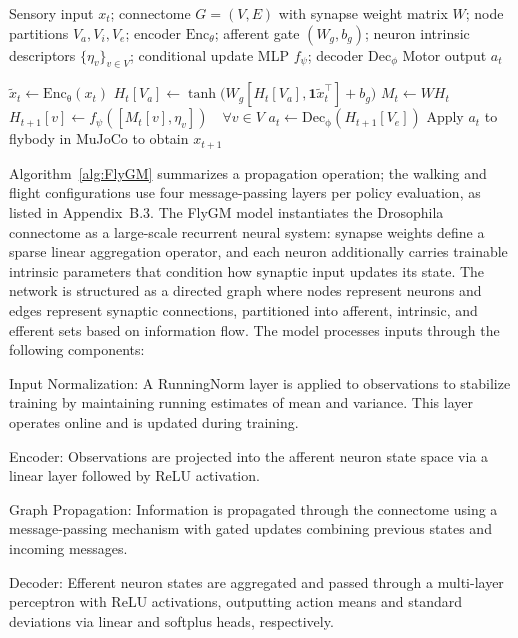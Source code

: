 \documentclass[a4paper]{easychair}
\begin{document}
\begin{algorithm}[H]
  \caption{Fly-connectomic Graph Model (FlyGM)}
  \label{alg:FlyGM}
  \begin{algorithmic}[1]
     Sensory input $x_t$; connectome $G=(V,E)$ with synapse weight matrix $W$; node partitions $V_a, V_i, V_e$;
    encoder $\mathrm{Enc}_\theta$; afferent gate $(W_g,b_g)$; neuron intrinsic descriptors $\{\eta_v\}_{v\in V}$;
    conditional update MLP $f_\psi$; decoder $\mathrm{Dec}_\phi$
     Motor output $a_t$

      \STATE $\tilde{x}_t \gets \mathrm{Enc_\theta}(x_t)$
      \STATE $H_t[V_a] \gets \tanh\!\big(W_g [H_t[V_a], \mathbf{1}\tilde{x}_t^\top] + b_g\big)$
      \STATE $M_t \gets W H_t$
      \STATE $H_{t+1}[v] \gets f_\psi([M_t[v], \eta_v]) \quad \forall v\in V$
      \STATE $a_t \gets \mathrm{Dec_\phi}(H_{t+1}[V_e])$
      \STATE Apply $a_t$ to flybody in MuJoCo to obtain $x_{t+1}$
    \ENDFOR
  \end{algorithmic}
\end{algorithm}

Algorithm~\ref{alg:FlyGM} summarizes a propagation operation; the walking and flight configurations use four message-passing layers per policy evaluation, as listed in Appendix~B.3. The FlyGM model instantiates the Drosophila connectome as a large-scale recurrent neural system: synapse weights define a sparse linear aggregation operator, and each neuron additionally carries trainable intrinsic parameters that condition how synaptic input updates its state. The network is structured as a directed graph where nodes represent neurons and edges represent synaptic connections, partitioned into afferent, intrinsic, and efferent sets based on information flow. The model processes inputs through the following components:

Input Normalization: A RunningNorm layer is applied to observations to stabilize training by maintaining running estimates of mean and variance. This layer operates online and is updated during training.

Encoder: Observations are projected into the afferent neuron state space via a linear layer followed by ReLU activation.

Graph Propagation: Information is propagated through the connectome using a message-passing mechanism with gated updates combining previous states and incoming messages.

Decoder: Efferent neuron states are aggregated and passed through a multi-layer perceptron with ReLU activations, outputting action means and standard deviations via linear and softplus heads, respectively.
\end{document}
